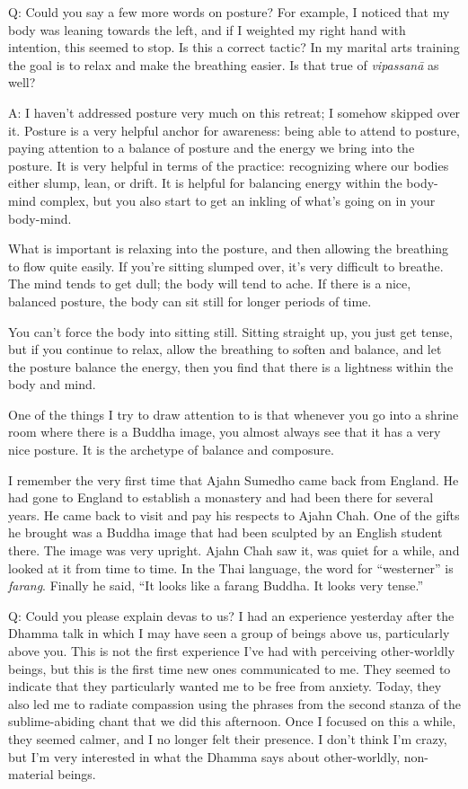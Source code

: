 \vspace{\the\qaskip}
Q: Could you say a few more words on posture? For example, I noticed
that my body was leaning towards the left, and if I weighted my right
hand with intention, this seemed to stop. Is this a correct tactic? In
my marital arts training the goal is to relax and make the breathing
easier. Is that true of \emph{vipassanā} as well?

\vspace{\the\qaskip}
A: I haven’t addressed posture very much on this retreat; I somehow
skipped over it. Posture is a very helpful anchor for awareness: being
able to attend to posture, paying attention to a balance of posture and
the energy we bring into the posture. It is very helpful in terms of the
practice: recognizing where our bodies either slump, lean, or drift. It
is helpful for balancing energy within the body-mind complex, but you
also start to get an inkling of what’s going on in your body-mind.

What is important is relaxing into the posture, and then allowing the
breathing to flow quite easily. If you’re sitting slumped over, it’s
very difficult to breathe. The mind tends to get dull; the body will
tend to ache. If there is a nice, balanced posture, the body can sit
still for longer periods of time.

You can’t force the body into sitting still. Sitting straight up, you
just get tense, but if you continue to relax, allow the breathing to
soften and balance, and let the posture balance the energy, then you
find that there is a lightness within the body and mind.

One of the things I try to draw attention to is that whenever you go
into a shrine room where there is a Buddha image, you almost always see
that it has a very nice posture. It is the archetype of balance and
composure.

I remember the very first time that Ajahn Sumedho came back from
England. He had gone to England to establish a monastery and had been
there for several years. He came back to visit and pay his respects to
Ajahn Chah. One of the gifts he brought was a Buddha image that had been
sculpted by an English student there. The image was very upright. Ajahn
Chah saw it, was quiet for a while, and looked at it from time to time.
In the Thai language, the word for “westerner” is \emph{farang}. Finally
he said, “It looks like a farang Buddha. It looks very tense.”

\vspace{\the\qaskip}
Q: Could you please explain devas to us? I had an experience yesterday
after the Dhamma talk in which I may have seen a group of beings above
us, particularly above you. This is not the first experience I’ve had
with perceiving other-worldly beings, but this is the first time new
ones communicated to me. They seemed to indicate that they particularly
wanted me to be free from anxiety. Today, they also led me to radiate
compassion using the phrases from the second stanza of the
sublime-abiding chant that we did this afternoon. Once I focused on this
a while, they seemed calmer, and I no longer felt their presence. I
don’t think I’m crazy, but I’m very interested in what the Dhamma says
about other-worldly, non-material beings.

